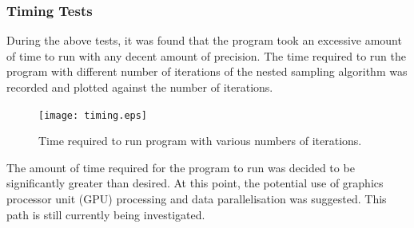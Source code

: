 \documentclass[a4paper,12pt]{article}
\begin{document}
\subsubsection{Timing Tests}
During the above tests, it was found that the program took an excessive amount of time to run with any decent amount of precision.  The time required to run the program with different number of iterations of the nested sampling algorithm was recorded and plotted against the number of iterations. 


\begin{figure}[!h]
 \begin{center}
  \texttt{[image: timing.eps]}
  \caption{Time required to run program with various numbers of iterations.}
 \end{center}
\end{figure}


The amount of time required for the program to run was decided to be significantly greater than desired.  At this point, the potential use of graphics processor unit (GPU) processing and data parallelisation was suggested.  This path is still currently being investigated.  

\newpage
\end{document}
